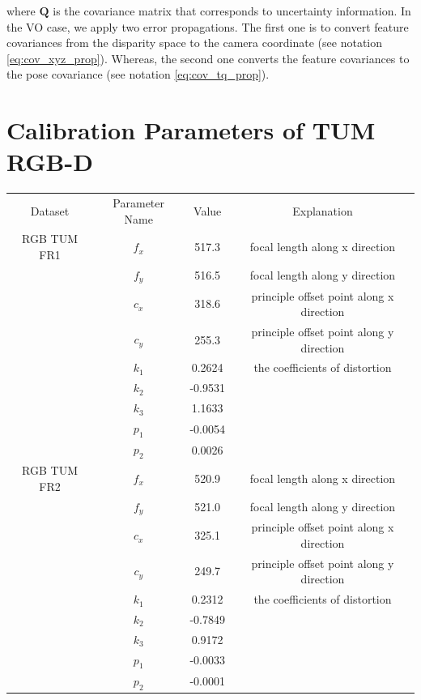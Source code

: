 \documentclass[a4paper]{report}
\numberwithin{figure}{section}
\begin{document}
where $\mathbf{Q}$ is the covariance matrix that corresponds to uncertainty information.
In the VO case, we apply two error propagations. The first one is to convert 
feature covariances from the disparity space to the camera coordinate 
(see notation \eqref{eq:cov_xyz_prop}). Whereas, the second one converts 
the feature covariances to the pose covariance (see notation 
\eqref{eq:cov_tq_prop}).

\section{Calibration Parameters of TUM RGB-D}

\begin{center}
  \begin{tabular}{|c|c|c|c|}\label{tb:tum_calib_param}
    Dataset & Parameter Name & Value & Explanation\\
    RGB TUM FR1 & $f_x$ & 517.3 & focal length along x direction\\
    & $f_y$ & 516.5 & focal length along y direction\\
    & $c_x$ & 318.6 & principle offset point along x direction\\
    & $c_y$ & 255.3 & principle offset point along y direction\\
    & $k_1$ & 0.2624 & the coefficients of distortion\\
    & $k_2$ & -0.9531 & \\
    & $k_3$ & 1.1633 & \\
    & $p_1$ & -0.0054 & \\
    & $p_2$ & 0.0026 & \\
    RGB TUM FR2 & $f_x$ & 520.9 & focal length along x direction\\
    & $f_y$ & 521.0 & focal length along y direction\\
    & $c_x$ & 325.1 & principle offset point along x direction\\
    & $c_y$ & 249.7 & principle offset point along y direction\\
    & $k_1$ & 0.2312 & the coefficients of distortion\\
    & $k_2$ & -0.7849 & \\
    & $k_3$ & 0.9172 & \\
    & $p_1$ & -0.0033 & \\
    & $p_2$ & -0.0001 & \\
\end{tabular}
\end{center}
\end{document}
